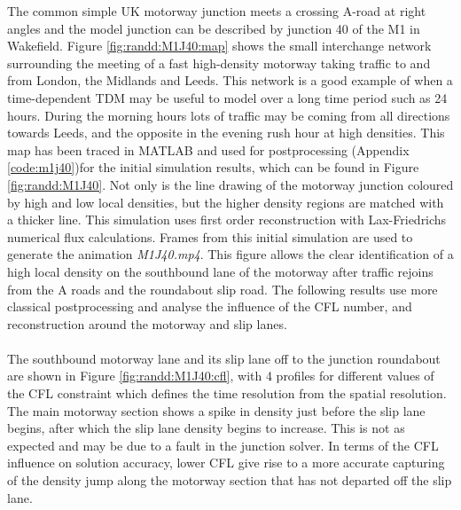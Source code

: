 	The common simple UK motorway junction meets a crossing A-road at right angles and the model junction can be described by junction 40 of the M1 in Wakefield. Figure \ref{fig:randd:M1J40:map} shows the small interchange network surrounding the meeting of a fast high-density motorway taking traffic to and from London, the Midlands and Leeds. This network is a good example of when a time-dependent TDM may be useful to model over a long time period such as 24 hours. During the morning hours lots of traffic may be coming from all directions towards Leeds, and the opposite in the evening rush hour at high densities. This map has been traced in MATLAB and used for postprocessing (Appendix \ref{code:m1j40})for the initial simulation results, which can be found in Figure \ref{fig:randd:M1J40}. Not only is the line drawing of the motorway junction coloured by high and low local densities, but the higher density regions are matched with a thicker line. This simulation uses first order reconstruction with Lax-Friedrichs numerical flux calculations. Frames from this initial simulation are used to generate the animation \emph{M1J40.mp4}. This figure allows the clear identification of a high local density on the southbound lane of the motorway after traffic rejoins from the A roads and the roundabout slip road. The following results use more classical postprocessing and analyse the influence of the CFL number, and reconstruction around the motorway and slip lanes.
	\\ \\
	The southbound motorway lane and its slip lane off to the junction roundabout are shown in Figure \ref{fig:randd:M1J40:cfl}, with 4 profiles for different values of the CFL constraint which defines the time resolution from the spatial resolution. The main motorway section shows a spike in density just before the slip lane begins, after which the slip lane density begins to increase. This is not as expected and may be due to a fault in the junction solver. In terms of the CFL influence on solution accuracy, lower CFL give rise to a more accurate capturing of the density jump along the motorway section that has not departed off the slip lane. 
	\\ \\
